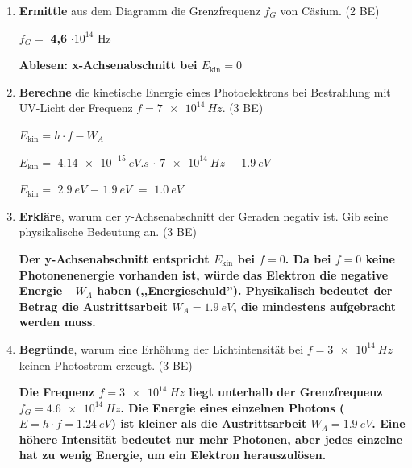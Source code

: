 \documentclass[11pt,a4paper]{article}
\newcommand{\lsg}[1]{\textcolor{loesung}{\textbf{#1}}}
\begin{document}
\begin{enumerate}[label=\alph*), leftmargin=*, nosep]
\item \textbf{Ermittle} aus dem Diagramm die Grenzfrequenz $f_G$ von Cäsium. \hfill (2 BE)

\vspace{0.3em}
$f_G = $ \lsg{4,6} $\cdot 10^{14}$ Hz

\lsg{Ablesen: x-Achsenabschnitt bei $E_{\text{kin}} = 0$}

\vspace{0.5em}

\item \textbf{Berechne} die kinetische Energie eines Photoelektrons bei Bestrahlung mit UV-Licht der Frequenz $f = \SI{7e14}{Hz}$. \hfill (3 BE)

\vspace{0.3em}
$E_{\text{kin}} = h \cdot f - W_A$

\vspace{0.3em}
$E_{\text{kin}} = $ \lsg{$\SI{4,14e-15}{eV.s}$} $\cdot$ \lsg{$\SI{7e14}{Hz}$} $-$ \lsg{$\SI{1,9}{eV}$}

\vspace{0.3em}
$E_{\text{kin}} = $ \lsg{$\SI{2,9}{eV}$} $-$ \lsg{$\SI{1,9}{eV}$} $=$ \lsg{$\SI{1,0}{eV}$}

\vspace{0.5em}

\item \textbf{Erkläre}, warum der y-Achsenabschnitt der Geraden negativ ist. Gib seine physikalische Bedeutung an. \hfill (3 BE)

\vspace{0.3em}
\lsg{Der y-Achsenabschnitt entspricht $E_{\text{kin}}$ bei $f = 0$. Da bei $f = 0$ keine Photonenenergie vorhanden ist, würde das Elektron die negative Energie $-W_A$ haben (,,Energieschuld''). Physikalisch bedeutet der Betrag die Austrittsarbeit $W_A = \SI{1,9}{eV}$, die mindestens aufgebracht werden muss.}

\vspace{0.5em}

\item \textbf{Begründe}, warum eine Erhöhung der Lichtintensität bei $f = \SI{3e14}{Hz}$ keinen Photostrom erzeugt. \hfill (3 BE)

\vspace{0.3em}
\lsg{Die Frequenz $f = \SI{3e14}{Hz}$ liegt unterhalb der Grenzfrequenz $f_G = \SI{4,6e14}{Hz}$. Die Energie eines einzelnen Photons ($E = h \cdot f = \SI{1,24}{eV}$) ist kleiner als die Austrittsarbeit $W_A = \SI{1,9}{eV}$. Eine höhere Intensität bedeutet nur mehr Photonen, aber jedes einzelne hat zu wenig Energie, um ein Elektron herauszulösen.}

\end{enumerate}
\end{document}
